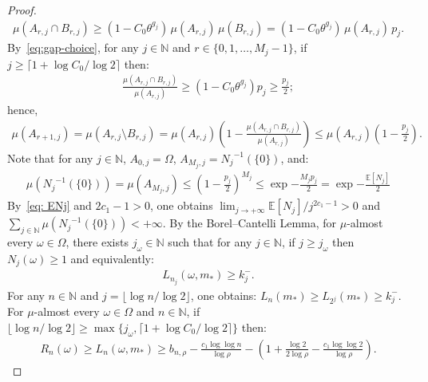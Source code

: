 \documentclass[12pt,reqno]{amsart}
\theoremstyle{definition}
\theoremstyle{plain}
\begin{document}
\begin{proof}
\begin{align*}
    \mu{\left(A_{r,j}\cap B_{r,j}\right)}
    \geq \left(1-C_0\theta^{g_j}\right)\,\mu{(A_{r,j})}\,\mu{(B_{r,j})}
    =\left(1-C_0\theta^{g_j}\right)\,\mu{(A_{r,j})}\,p_j.
\end{align*}
By~\eqref{eq:gap-choice}, for any $j\in\mathbb{N}$ and $r\in\{0,1,\dots,M_j-1\}$, if $j\geq\lceil{1+\log{C_0}/\log{2}\rceil}$ then:
\begin{align*}
    \frac{\mu{\left(A_{r,j}\cap B_{r,j}\right)}}{\mu{\left(A_{r,j}\right)}}
    \geq \left(1-C_0\theta^{g_j}\right)p_j\geq \frac{p_j}{2};
\end{align*}
hence, 
\begin{align*}
    \mu{\left(A_{r+1,j}\right)}
    =\mu{\left(A_{r,j}\setminus B_{r,j}\right)}
    =\mu{\left(A_{r,j}\right)}\left(1-\frac{\mu{\left(A_{r,j}\cap B_{r,j}\right)}}{\mu{\left(A_{r,j}\right)}}\right)
    \leq \mu{\left(A_{r,j}\right)}\left(1-\frac{p_j}{2}\right).
\end{align*}
Note that for any $j\in\mathbb{N}$, $A_{0,j}=\Omega$, $A_{M_j,j}={N_j}^{-1}(\{0\})$, and:
\begin{align*}
    \mu{\left({N_j}^{-1}(\{0\})\right)}
    =\mu{\left(A_{M_j,j}\right)}
    \leq \left(1-\frac{p_j}{2}\right)^{M_j}
    \leq \exp{-\frac{M_jp_j}{2}}
    = \exp{-\frac{\mathbb{E}[N_j]}{2}}
\end{align*}
By~\eqref{eq: ENj} and $2c_1-1>0$, one obtains $\lim_{j\to+\infty}\mathbb{E}[N_j]/j^{2c_1-1}>0$ and $\sum_{j\in\mathbb{N}} \mu{({N_j}^{-1}(\{0\}))}<+\infty$. By the Borel--Cantelli Lemma, for $\mu$-almost every $\omega\in\Omega$, there exists $j_\omega\in\mathbb{N}$ such that for any $j\in\mathbb{N}$, if $j\geq j_\omega$ then $N_j(\omega)\geq 1$ and equivalently: 
\begin{align*}
    L_{n_j}(\omega,m_*)\geq k^-_j.
\end{align*}
For any $n\in\mathbb{N}$ and $j=\lfloor \log{n}/\log{2} \rfloor$, one obtains: $L_n(m_*)\geq L_{2^j}(m_*)\geq k^-_j$. For $\mu$-almost every $\omega\in\Omega$ and $n\in\mathbb{N}$, if $\lfloor \log{n}/\log{2} \rfloor\geq\max{\{j_\omega,\lceil{1+\log{C_0}/\log{2}\rceil}\}}$ then:
\begin{align}\label{eq:abstract-lower}
    R_n(\omega)
    \geq L_n(\omega,m_*)
    \geq b_{n,\rho}-\frac{c_1\log{\log{n}}}{\log{\rho}}-\left(1+\frac{\log{2}}{2\log{\rho}}-\frac{c_1\log{\log{2}}}{\log{\rho}}\right).
\end{align}


\end{proof}
\end{document}
